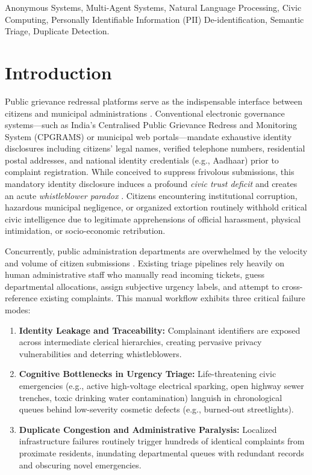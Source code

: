 \documentclass[conference]{IEEEtran}
\begin{document}
\begin{IEEEkeywords}
Anonymous Systems, Multi-Agent Systems, Natural Language Processing, Civic Computing, Personally Identifiable Information (PII) De-identification, Semantic Triage, Duplicate Detection.
\end{IEEEkeywords}

\section{Introduction}
\label{sec:intro}
Public grievance redressal platforms serve as the indispensable interface between citizens and municipal administrations \cite{worldbank2020governance}. Conventional electronic governance systems---such as India's Centralised Public Grievance Redress and Monitoring System (CPGRAMS) \cite{cpgrams2022} or municipal web portals---mandate exhaustive identity disclosures including citizens' legal names, verified telephone numbers, residential postal addresses, and national identity credentials (e.g., Aadhaar) prior to complaint registration. While conceived to suppress frivolous submissions, this mandatory identity disclosure induces a profound \textit{civic trust deficit} and creates an acute \textit{whistleblower paradox} \cite{whistleblower2021}. Citizens encountering institutional corruption, hazardous municipal negligence, or organized extortion routinely withhold critical civic intelligence due to legitimate apprehensions of official harassment, physical intimidation, or socio-economic retribution.

Concurrently, public administration departments are overwhelmed by the velocity and volume of citizen submissions \cite{almarabeh2016electronic}. Existing triage pipelines rely heavily on human administrative staff who manually read incoming tickets, guess departmental allocations, assign subjective urgency labels, and attempt to cross-reference existing complaints. This manual workflow exhibits three critical failure modes:
\begin{enumerate}
    \item \textbf{Identity Leakage and Traceability:} Complainant identifiers are exposed across intermediate clerical hierarchies, creating pervasive privacy vulnerabilities and deterring whistleblowers.
    \item \textbf{Cognitive Bottlenecks in Urgency Triage:} Life-threatening civic emergencies (e.g., active high-voltage electrical sparking, open highway sewer trenches, toxic drinking water contamination) languish in chronological queues behind low-severity cosmetic defects (e.g., burned-out streetlights).
    \item \textbf{Duplicate Congestion and Administrative Paralysis:} Localized infrastructure failures routinely trigger hundreds of identical complaints from proximate residents, inundating departmental queues with redundant records and obscuring novel emergencies.
\end{enumerate}
\end{document}
